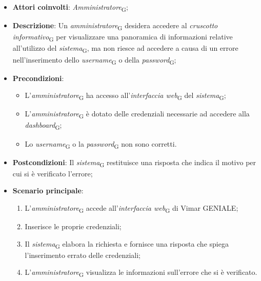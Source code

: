 \begin{itemize}
    \item \textbf{Attori coinvolti}: \textit{Amministratore}\textsubscript{G};
    \item \textbf{Descrizione}: Un \textit{amministratore}\textsubscript{G} desidera accedere al \textit{cruscotto informativo}\textsubscript{G} per visualizzare una panoramica di informazioni relative all’utilizzo del \textit{sistema}\textsubscript{G}, ma non riesce ad accedere a causa di un errore nell’inserimento dello \textit{username}\textsubscript{G} o della \textit{password}\textsubscript{G};
    \item \textbf{Precondizioni}: 
        \begin{itemize}
            \item L’\textit{amministratore}\textsubscript{G} ha accesso all’\textit{interfaccia web}\textsubscript{G} del \textit{sistema}\textsubscript{G};
            \item L’\textit{amministratore}\textsubscript{G} è dotato delle credenziali necessarie ad accedere alla \textit{dashboard}\textsubscript{G};
            \item Lo \textit{username}\textsubscript{G} o la \textit{password}\textsubscript{G} non sono corretti.
        \end{itemize}
    \item \textbf{Postcondizioni}: Il \textit{sistema}\textsubscript{G} restituisce una risposta che indica il motivo per cui si è verificato l’errore;
    \item \textbf{Scenario principale}:
    \begin{enumerate}
    \item L’\textit{amministratore}\textsubscript{G} accede all’\textit{interfaccia web}\textsubscript{G} di Vimar GENIALE;
    \item Inserisce le proprie credenziali;
    \item Il \textit{sistema}\textsubscript{G} elabora la richiesta e fornisce una risposta che spiega l’inserimento errato delle credenziali;
    \item L’\textit{amministratore}\textsubscript{G} visualizza le informazioni sull’errore che si è verificato.
    \end{enumerate}
\end{itemize}

